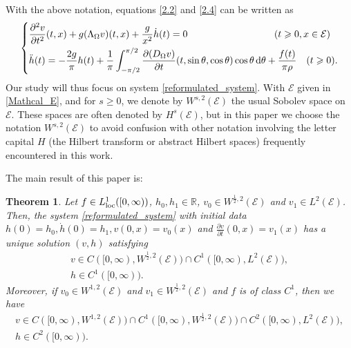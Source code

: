 \documentclass{amsart} %
\numberwithin{equation}{section}
\newtheorem{theorem}{Theorem}[section]
\theoremstyle{definition}
\begin{document}
With the above notation, equations \eqref{2.2} and \eqref{2.4} can  be written as
\begin{equation}\label{reformulated_system}
\left\{
\begin{aligned}
&\frac{\partial^2 v}{\partial t^2}(t,x)+g(\Lambda_{\Omega}v)(t,x)+\frac{g}{x^2}\dot h(t)=0\qquad\qquad\qquad\quad\quad\quad(t\geqslant 0, x\in\mathcal{E})\\
&\ddot{h}(t)=-\frac{2g}{\pi}h(t)+\frac{1}{\pi}\int_{-\pi/2}^{\pi/2}\frac{\partial(D_{\Omega} v)}{\partial t}(t,\sin\theta,\cos\theta)\cos\theta\,{\rm d}\theta+\frac{f(t)}{\pi \rho}\quad (t\geqslant 0).
\end{aligned}
\right.
\end{equation}
Our study will thus focus on system \eqref{reformulated_system}.
With $\mathcal{E}$ given in \eqref{Mathcal_E}, and for $s\geqslant 0$, we denote by $W^{s,2}(\mathcal{E})$ the usual Sobolev space on $\mathcal{E}$.
These spaces are often denoted by $H^s(\mathcal{E})$, but in this paper we choose the notation $W^{s,2}(\mathcal{E})$ to avoid confusion with other notation involving the letter capital $H$ (the Hilbert transform or abstract Hilbert spaces) frequently encountered in this work.

The main result of this paper is:

\begin{theorem}\label{well_posedness}
Let $f\in L_{{\rm loc}}^1([0,\infty))$, $h_0, h_1\in \mathbb{R}$, $v_0\in W^{\frac12,2}(\mathcal{E})$ and  $v_1\in L^2(\mathcal{E})$. Then, the system \eqref{reformulated_system} with initial data $h(0)=h_0, \dot h(0)=h_1, v(0,x)=v_0(x)$ and $\frac{\partial v}{\partial t}(0,x)=v_1(x)$ has a unique solution $(v,h)$ satisfying 
\begin{gather}
 v\in C([0,\infty),W^{\frac12,2}(\mathcal{E}))\cap C^1([0,\infty), L^2(\mathcal{E})),\\
 h\in C^1([0,\infty)).
\end{gather}
Moreover, if $v_0\in W^{1,2}(\mathcal{E})$ and $v_1\in W^{\frac12,2}(\mathcal{E})$ and $f$ is of class $C^1$, then we have
\begin{gather}
 v\in C([0,\infty),W^{1,2}(\mathcal{E}))\cap C^1([0,\infty),  W^{\frac12,2}(\mathcal{E}))\cap C^2([0,\infty),L^2(\mathcal{E})),\\
 h\in C^2([0,\infty)).
\end{gather}
\end{theorem}



\end{document}
